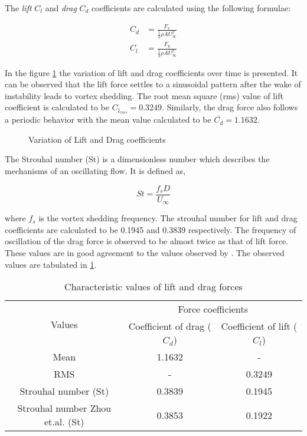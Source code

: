 The \textit{lift} $C_l$ and \textit{drag} $C_d$ coefficients are calculated using the following formulae:

\begin{align}
C_d &= \frac{F_x}{\frac{1}{2} \rho A U_{\infty}^{2}}\\
C_l &= \frac{F_y}{\frac{1}{2} \rho A U_{\infty}^{2}}
\end{align}

In the figure \ref{fig:4.4} the variation of lift and drag coefficients over time is presented. It can be observed that the lift force settles to a sinusoidal pattern after the wake of instability leads to vortex shedding. The root mean square (rms) value of lift coefficient is calculated to be $C_{l_{rms}} = 0.3249$. Similarly, the drag force also follows a periodic behavior with the mean value calculated to be $\bar{C_d} = 1.1632$. 

\begin{figure}[H]
\centering
{}
\caption{Variation of Lift and Drag coefficients}
\label{fig:4.4}
\end{figure}

The Strouhal number (St) is a dimensionless number which describes the mechanisms of an oscillating flow. It is defined as,

\begin{equation}
St = \frac{f_s D}{U_\infty}
\end{equation}

where $f_s$ is the vortex shedding frequency. The strouhal number for lift and drag coefficients are calculated to be 0.1945 and 0.3839 respectively. The frequency of oscillation of the drag force is observed to be almost twice as that of lift force. These values are in good agreement to the values observed by \citet{zhou1999vortex}. The observed values are tabulated in \ref{table:4.3}.

\begin{table} [H]
\centering
	\begin{tabular}{|c|c|c|}
	\hline 
	\multirow{2}{*}{Values} & \multicolumn{2}{c|}{Force coefficients}\tabularnewline
	\cline{2-3} 
	 & Coefficient of drag ($C_{d}$) & Coefficient of lift ($C_{l}$)\tabularnewline
	\hline 
	Mean & 1.1632 & -\tabularnewline
	\hline 
	RMS & - & 0.3249\tabularnewline
	\hline 
	Strouhal number (St) & 0.3839 & 0.1945\tabularnewline
	\hline 
	Strouhal number Zhou et.al. (St) & 0.3853 & 0.1922\tabularnewline
	\hline 
	\end{tabular}
\caption{Characteristic values of lift and drag forces}
\label{table:4.3}
\end{table}

